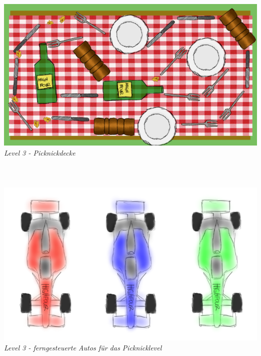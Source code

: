 \begin{flushright}
\includegraphics[width=1\textwidth]{img/picknick.png}
\textit{Level 3 - Picknickdecke}\ \\
\ \\
\ \\
\ \\
\includegraphics[width=1\textwidth]{img/autos.png}
\textit{Level 3 - ferngesteuerte Autos für das Picknicklevel}

\newpage


\end{flushright}
